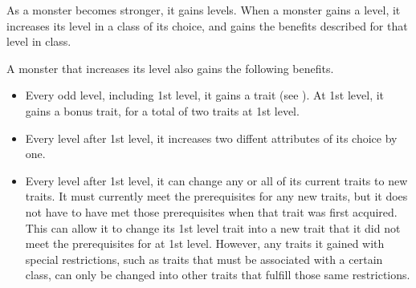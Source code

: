     As a monster becomes stronger, it gains levels.
    When a monster gains a level, it increases its level in a class of its choice, and gains the benefits described for that level in class.

    A monster that increases its level also gains the following benefits.
    \begin{itemize}
        \item Every odd level, including 1st level, it gains a trait (see ).
            At 1st level, it gains a bonus trait, for a total of two traits at 1st level.
        \item Every level after 1st level, it increases two diffent attributes of its choice by one.
        \item Every level after 1st level, it can change any or all of its current traits to new traits.
            It must currently meet the prerequisites for any new traits, but it does not have to have met those prerequisites when that trait was first acquired.
            This can allow it to change its 1st level trait into a new trait that it did not meet the prerequisites for at 1st level.
            However, any traits it gained with special restrictions, such as traits that must be associated with a certain class, can only be changed into other traits that fulfill those same restrictions.
    \end{itemize}
